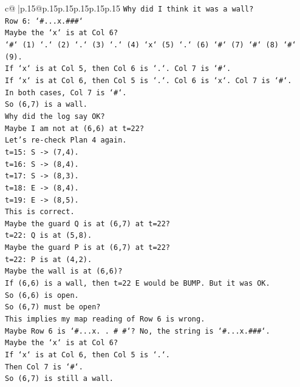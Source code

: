 \documentclass{article}
\begin{document}
{\begin{supertabular}{c@{$\;$}|p{.15\linewidth}@{}p{.15\linewidth}p{.15\linewidth}p{.15\linewidth}p{.15\linewidth}p{.15\linewidth}}
{{{\texttt{Why did I think it was a wall?} \\
\texttt{Row 6: `\#...x.\#\#\#`} \\
\texttt{Maybe the `x` is at Col 6?} \\
\texttt{`\#` (1) `.` (2) `.` (3) `.` (4) `x` (5) `.` (6) `\#` (7) `\#` (8) `\#` (9).} \\
\texttt{If `x` is at Col 5, then Col 6 is `.`. Col 7 is `\#`.} \\
\texttt{If `x` is at Col 6, then Col 5 is `.`. Col 6 is `x`. Col 7 is `\#`.} \\
\texttt{In both cases, Col 7 is `\#`.} \\
\texttt{So (6,7) is a wall.} \\
\texttt{Why did the log say OK?} \\
\texttt{Maybe I am not at (6,6) at t=22?} \\
\texttt{Let's re{-}check Plan 4 again.} \\
\texttt{t=15: S {-}> (7,4).} \\
\texttt{t=16: S {-}> (8,4).} \\
\texttt{t=17: S {-}> (8,3).} \\
\texttt{t=18: E {-}> (8,4).} \\
\texttt{t=19: E {-}> (8,5).} \\
\texttt{This is correct.} \\
\texttt{Maybe the guard Q is at (6,7) at t=22?} \\
\texttt{t=22: Q is at (5,8).} \\
\texttt{Maybe the guard P is at (6,7) at t=22?} \\
\texttt{t=22: P is at (4,2).} \\
\texttt{Maybe the wall is at (6,6)?} \\
\texttt{If (6,6) is a wall, then t=22 E would be BUMP. But it was OK.} \\
\texttt{So (6,6) is open.} \\
\texttt{So (6,7) must be open?} \\
\texttt{This implies my map reading of Row 6 is wrong.} \\
\texttt{Maybe Row 6 is `\#...x. . \# \#`? No, the string is `\#...x.\#\#\#`.} \\
\texttt{Maybe the `x` is at Col 6?} \\
\texttt{If `x` is at Col 6, then Col 5 is `.`.} \\
\texttt{Then Col 7 is `\#`.} \\
\texttt{So (6,7) is still a wall.} \\
}}}
\end{supertabular}}
\end{document}
